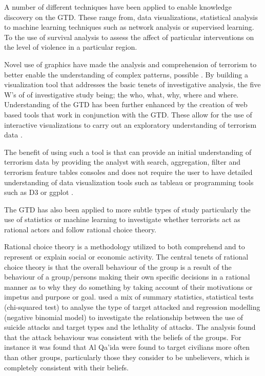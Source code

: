 A number of different techniques have been applied to enable knowledge discovery on the GTD. These range from, data visualizations, statistical analysis to machine learning techniques such as network analysis or supervised learning. To the use of survival analysis to assess the affect of particular interventions on the level of violence in a particular region.

Novel use of graphics have made the analysis and comprehension of terrorism to better enable the understanding of complex patterns, possible \citep{wang2008investigative}. By building a visualization tool that addresses the basic tenets of investigative analysis, the five W's of of investigative study being; the who, what, why, where and where. Understanding of the GTD has been further enhanced by the creation of web based tools that work in conjunction with the GTD. These allow for the use of interactive visualizations  to carry out an exploratory understanding of terrorism data \citep{lee2008exploring}. 

The benefit of using such a tool is that can provide an initial understanding of terrorism data by providing the analyst with search, aggregation, filter and terrorism feature tables consoles and does not require the user to have detailed understanding of data visualization tools such as tableau \citep{chabot2003tableau} or programming tools such as D3 \citep{bostock2012d3} or ggplot \citep{wickham2016programming}.

The GTD has also been applied to more subtle types of study particularly the use of statistics or machine learning to investigate whether terrorists act as rational actors and follow rational choice theory. 

Rational choice theory is a methodology utilized to both comprehend and to represent or explain social or economic activity. The central tenets of rational choice theory is that the overall behaviour of the group is a result of the behaviour of a group/persons making their own specific decisions in a rational manner as to why they do something by taking account of their motivations or impetus and purpose or goal. \citep{hepworth2013analysis} used a mix of summary statistics, statistical tests (chi-squared test) to analyse the type of target attacked and regression modelling (negative binomial model) to investigate the relationship between the use of suicide attacks and target types and the lethality of attacks. The analysis found that the attack behaviour was consistent with the beliefs of the groups. For instance it was found that Al Qa'ida were found to target civilians more often than other groups, particularly those they consider to be unbelievers, which is completely consistent with their beliefs.


